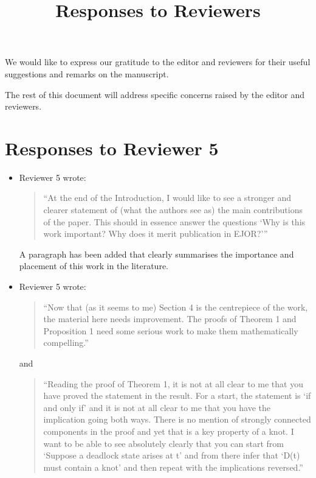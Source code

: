 \documentclass{article}
\title{Responses to Reviewers}
\author{}
\date{}
\begin{document}
\maketitle

We would like to express our gratitude to the editor and reviewers for their
useful suggestions and remarks on the manuscript.

The rest of this document will address specific concerns raised by the editor
and reviewers.

\section*{Responses to Reviewer 5}

\begin{itemize}

\item Reviewer 5 wrote:
\begin{quote}
``At the end of the Introduction, I would like to see a stronger and clearer statement of (what the authors see as) the main contributions of the paper. This should in essence answer the questions ‘Why is this work important? Why does it merit publication in EJOR?’''
\end{quote}

A paragraph has been added that clearly summarises the importance and placement of this work in the literature.

\item Reviewer 5 wrote:
\begin{quote}
``Now that (as it seems to me) Section 4 is the centrepiece of the work, the material here needs improvement. The proofs of Theorem 1 and Proposition 1 need some serious work to make them mathematically compelling.''
\end{quote}

and

\begin{quote}
``Reading the proof of Theorem 1, it is not at all clear to me that you have proved the statement in the result. For a start, the statement is ‘if and only if’ and it is not at all clear to me that you have the implication going both ways. There is no mention of strongly connected components in the proof and yet that is a key property of a knot. I want to be able to see absolutely clearly that you can start from ‘Suppose a deadlock state arises at t’ and from there infer that ‘D(t) must contain a knot’ and then repeat with the implications reversed.''
\end{quote}


\end{itemize}
\end{document}
